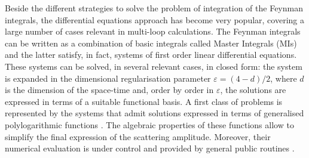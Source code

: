 \documentclass[final,1p,times]{elsarticle}
\begin{document}
Beside the different strategies to solve the problem of integration of the Feynman integrals, the differential equations approach \cite{Kotikov:1990kg,Kotikov:1991pm,Bern:1993kr,Remiddi:1997ny,Gehrmann:1999as,Argeri:2007up,Henn:2013pwa,Henn:2014qga} has become very popular, covering a large number of cases relevant in multi-loop calculations.
The Feynman integrals can be written as a combination of basic integrals called Master Integrals (MIs) and the latter satisfy, in fact, systems of first order linear differential equations. These systems can be solved, in several relevant cases, in closed form: the system is expanded in the dimensional regularisation parameter $\varepsilon=(4-d)/2$, where $d$ is the dimension of the space-time and, order by order in $\varepsilon$, the solutions are expressed in terms of a suitable functional basis. A first class of problems is represented by the systems that admit solutions expressed in terms of 
generalised polylogarithmic functions \cite{Goncharov:polylog,Goncharov:1998kja,Goncharov:2001iea,Remiddi:1999ew}.
%
%
The algebraic properties of these functions allow to simplify the final expression of the scattering amplitude. Moreover, their numerical evaluation is under control and provided by general public routines \cite{Gehrmann:2001pz,Gehrmann:2001jv,Vollinga:2004sn,Bonciani:2010ms,Naterop:2019xaf}.
%
%
\end{document}
